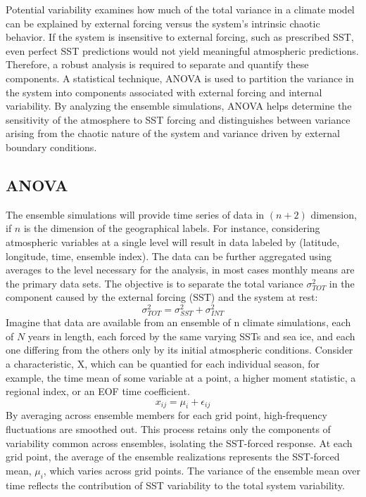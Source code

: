 Potential variability examines how much of the total variance in a climate model can be explained by external forcing versus the system's intrinsic chaotic behavior. If the system is insensitive to external forcing, such as prescribed SST, even perfect SST predictions would not yield meaningful atmospheric predictions. Therefore, a robust analysis is required to separate and quantify these components. A statistical technique, ANOVA is used to partition the variance in the system into components associated with external forcing and internal variability. By analyzing the ensemble simulations, ANOVA helps determine the sensitivity of the atmosphere to SST forcing and distinguishes between variance arising from the chaotic nature of the system and variance driven by external boundary conditions.
\subsection{ANOVA} The ensemble simulations will provide time series of data in $(n+2)$ dimension, if $n$ is
the dimension of the geographical labels. For instance, considering atmospheric variables at a single level will result in data labeled by (latitude, longitude, time, ensemble index). The data can be further aggregated using averages to the level necessary for the analysis, in most cases monthly means are the primary data sets. The objective is to separate the total variance $\sigma^2_{TOT}$ in the component caused by the external forcing (SST) and the system at rest: 
$$\sigma_{TOT}^2=\sigma^2_{SST}+\sigma^2_{INT}$$
Imagine that data are available from an ensemble of n climate
simulations, each of $N$ years in length, each forced by the same
varying SSTs and sea ice, and each one differing from the others only
by its initial atmospheric conditions. Consider a characteristic, X, which can be quantied for each individual season, for example, the time mean of some variable at a point, a higher moment statistic, a regional index, or an EOF time coefficient. 
$$x_{ij}=\mu_i+\epsilon_{ij}$$
By averaging across ensemble members for each grid point, high-frequency fluctuations are smoothed out. This process retains only the components of variability common across ensembles, isolating the SST-forced response. At each grid point, the average of the ensemble realizations represents the SST-forced mean, $\mu_i$, which varies across grid points. The variance of the ensemble mean over time reflects the contribution of SST variability to the total system variability.

